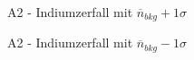 \documentclass{article}
\begin{document}
\begin{figure}[!h]
    \centering
    \caption{A2 - Indiumzerfall mit $\overline{n}_{bkg} + 1\sigma$}
    \label{fig:A2-ImUG+1}
\end{figure}

\begin{figure}[!h]
    \centering
    \caption{A2 - Indiumzerfall mit $\overline{n}_{bkg} - 1\sigma$}
    \label{fig:A2-ImUG-1}
\end{figure}



\clearpage
\newpage
\end{document}
